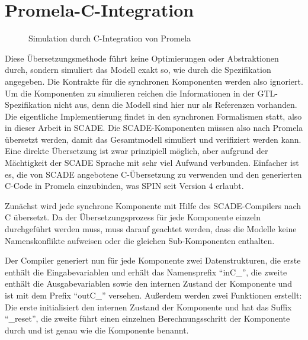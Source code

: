\section{Promela-C-Integration}
\begin{figure}
  \centering
  \caption{Simulation durch C-Integration von Promela}
\end{figure}

Diese Übersetzungsmethode führt keine Optimierungen oder Abstraktionen durch, sondern simuliert das Modell exakt so, wie durch die Spezifikation angegeben.
Die Kontrakte für die synchronen Komponenten werden also ignoriert.
Um die Komponenten zu simulieren reichen die Informationen in der GTL-Spezifikation nicht aus, denn die Modell sind hier nur als Referenzen vorhanden.
Die eigentliche Implementierung findet in den synchronen Formalismen statt, also in dieser Arbeit in SCADE.
Die SCADE-Komponenten müssen also nach Promela übersetzt werden, damit das Gesamtmodell simuliert und verifiziert werden kann.
Eine direkte Übersetzung ist zwar prinzipiell möglich, aber aufgrund der Mächtigkeit der SCADE Sprache mit sehr viel Aufwand verbunden.
Einfacher ist es, die von SCADE angebotene C-Übersetzung zu verwenden und den generierten C-Code in Promela einzubinden, was SPIN seit Version 4 erlaubt.

Zunächst wird jede synchrone Komponente mit Hilfe des SCADE-Compilers nach C übersetzt.
Da der Übersetzungsprozess für jede Komponente einzeln durchgeführt werden muss, muss darauf geachtet werden, dass die Modelle keine Namenskonflikte aufweisen oder die gleichen Sub-Komponenten enthalten\cite{scade_c_integration}.

Der Compiler generiert nun für jede Komponente zwei Datenstrukturen, die erste enthält die Eingabevariablen und erhält das Namensprefix "`inC\_"', die zweite enthält die Ausgabevariablen sowie den internen Zustand der Komponente und ist mit dem Prefix "`outC\_"' versehen.
Außerdem werden zwei Funktionen erstellt:
Die erste initialisiert den internen Zustand der Komponente und hat das Suffix "`\_reset"', die zweite führt einen einzelnen Berechnungsschritt der Komponente durch und ist genau wie die Komponente benannt.

